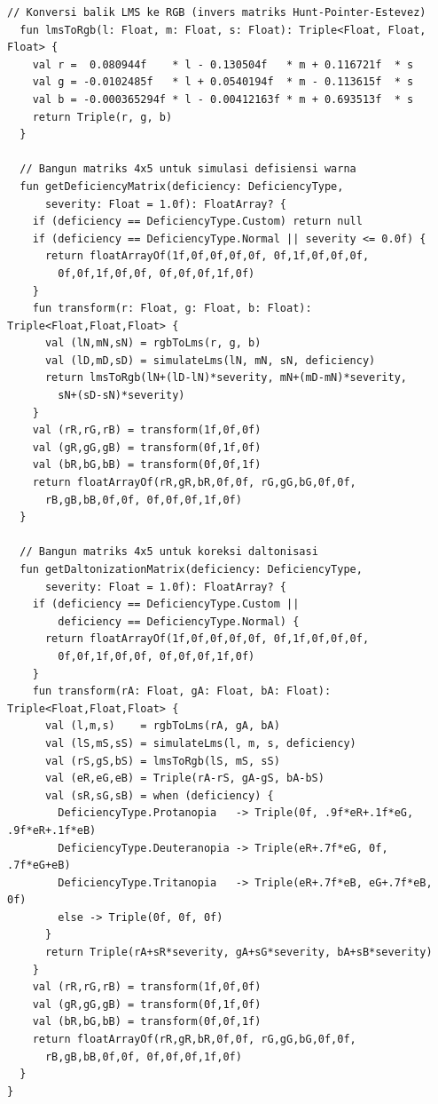 {\begin{lstlisting}[caption={Implementasi konversi ruang warna RGB--LMS dan pembangkitan matriks transformasi defisiensi serta daltonisasi}, label={lst:colorprocessor}]
  // Konversi balik LMS ke RGB (invers matriks Hunt-Pointer-Estevez)
  fun lmsToRgb(l: Float, m: Float, s: Float): Triple<Float, Float, Float> {
    val r =  0.080944f    * l - 0.130504f   * m + 0.116721f  * s
    val g = -0.0102485f   * l + 0.0540194f  * m - 0.113615f  * s
    val b = -0.000365294f * l - 0.00412163f * m + 0.693513f  * s
    return Triple(r, g, b)
  }

  // Bangun matriks 4x5 untuk simulasi defisiensi warna
  fun getDeficiencyMatrix(deficiency: DeficiencyType,
      severity: Float = 1.0f): FloatArray? {
    if (deficiency == DeficiencyType.Custom) return null
    if (deficiency == DeficiencyType.Normal || severity <= 0.0f) {
      return floatArrayOf(1f,0f,0f,0f,0f, 0f,1f,0f,0f,0f,
        0f,0f,1f,0f,0f, 0f,0f,0f,1f,0f)
    }
    fun transform(r: Float, g: Float, b: Float): Triple<Float,Float,Float> {
      val (lN,mN,sN) = rgbToLms(r, g, b)
      val (lD,mD,sD) = simulateLms(lN, mN, sN, deficiency)
      return lmsToRgb(lN+(lD-lN)*severity, mN+(mD-mN)*severity,
        sN+(sD-sN)*severity)
    }
    val (rR,rG,rB) = transform(1f,0f,0f)
    val (gR,gG,gB) = transform(0f,1f,0f)
    val (bR,bG,bB) = transform(0f,0f,1f)
    return floatArrayOf(rR,gR,bR,0f,0f, rG,gG,bG,0f,0f,
      rB,gB,bB,0f,0f, 0f,0f,0f,1f,0f)
  }

  // Bangun matriks 4x5 untuk koreksi daltonisasi
  fun getDaltonizationMatrix(deficiency: DeficiencyType,
      severity: Float = 1.0f): FloatArray? {
    if (deficiency == DeficiencyType.Custom ||
        deficiency == DeficiencyType.Normal) {
      return floatArrayOf(1f,0f,0f,0f,0f, 0f,1f,0f,0f,0f,
        0f,0f,1f,0f,0f, 0f,0f,0f,1f,0f)
    }
    fun transform(rA: Float, gA: Float, bA: Float): Triple<Float,Float,Float> {
      val (l,m,s)    = rgbToLms(rA, gA, bA)
      val (lS,mS,sS) = simulateLms(l, m, s, deficiency)
      val (rS,gS,bS) = lmsToRgb(lS, mS, sS)
      val (eR,eG,eB) = Triple(rA-rS, gA-gS, bA-bS)
      val (sR,sG,sB) = when (deficiency) {
        DeficiencyType.Protanopia   -> Triple(0f, .9f*eR+.1f*eG, .9f*eR+.1f*eB)
        DeficiencyType.Deuteranopia -> Triple(eR+.7f*eG, 0f, .7f*eG+eB)
        DeficiencyType.Tritanopia   -> Triple(eR+.7f*eB, eG+.7f*eB, 0f)
        else -> Triple(0f, 0f, 0f)
      }
      return Triple(rA+sR*severity, gA+sG*severity, bA+sB*severity)
    }
    val (rR,rG,rB) = transform(1f,0f,0f)
    val (gR,gG,gB) = transform(0f,1f,0f)
    val (bR,bG,bB) = transform(0f,0f,1f)
    return floatArrayOf(rR,gR,bR,0f,0f, rG,gG,bG,0f,0f,
      rB,gB,bB,0f,0f, 0f,0f,0f,1f,0f)
  }
}
\end{lstlisting}

}
